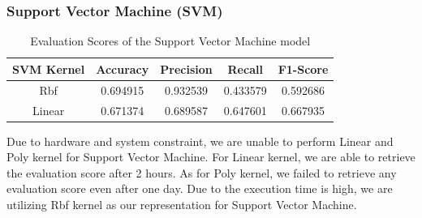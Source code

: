 \documentclass[11pt]{article}
\begin{document}
\clearpage
\subsubsection{Support Vector Machine (SVM)}
\begin{table}[ht]
\centering
\caption{\label{tab:svmMetrics}Evaluation Scores of the Support Vector Machine model}
\begin{adjustbox}{width=0.7\textwidth}
\begin{tabular}{|c|c|c|c|c|}
\hline
\textbf{SVM Kernel} & \textbf{Accuracy} & \textbf{Precision} & \textbf{Recall} & \textbf{F1-Score} \\ \hline
Rbf        & 0.694915          & 0.932539           & 0.433579        & 0.592686          \\ \hline
Linear        & 0.671374          & 0.689587           & 0.647601        & 0.667935          \\ \hline
\end{tabular}
\end{adjustbox}
\end{table}

Due to hardware and system constraint, we are unable to perform Linear and Poly kernel for Support Vector Machine. For Linear kernel, we are able to retrieve the evaluation score after 2 hours. As for Poly kernel, we failed to retrieve any evaluation score even after one day. Due to the execution time is high, we are utilizing Rbf kernel as our representation for Support Vector Machine.
\end{document}
